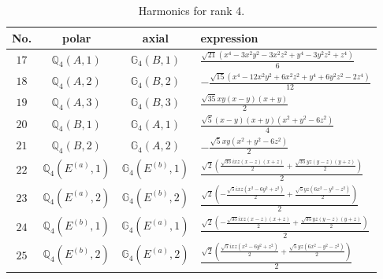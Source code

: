 \documentclass[fleqn,8pt,landscape]{jsarticle}
\begin{document}
\begin{table}[ht!]
\begin{center}
\caption{Harmonics for rank 4.}
\renewcommand{\arraystretch}{1.3}
\begin{tabular}{cccl} \hline \hline
No. & polar & axial & expression \\ \hline
$ 17 $ & $ \mathbb{Q}_{4}(A,1) $ & $ \mathbb{G}_{4}(B,1) $ & $ \frac{\sqrt{21} \left(x^{4} - 3 x^{2} y^{2} - 3 x^{2} z^{2} + y^{4} - 3 y^{2} z^{2} + z^{4}\right)}{6} $ \\
$ 18 $ & $ \mathbb{Q}_{4}(A,2) $ & $ \mathbb{G}_{4}(B,2) $ & $ - \frac{\sqrt{15} \left(x^{4} - 12 x^{2} y^{2} + 6 x^{2} z^{2} + y^{4} + 6 y^{2} z^{2} - 2 z^{4}\right)}{12} $ \\
$ 19 $ & $ \mathbb{Q}_{4}(A,3) $ & $ \mathbb{G}_{4}(B,3) $ & $ \frac{\sqrt{35} x y \left(x - y\right) \left(x + y\right)}{2} $ \\
$ 20 $ & $ \mathbb{Q}_{4}(B,1) $ & $ \mathbb{G}_{4}(A,1) $ & $ \frac{\sqrt{5} \left(x - y\right) \left(x + y\right) \left(x^{2} + y^{2} - 6 z^{2}\right)}{4} $ \\
$ 21 $ & $ \mathbb{Q}_{4}(B,2) $ & $ \mathbb{G}_{4}(A,2) $ & $ - \frac{\sqrt{5} x y \left(x^{2} + y^{2} - 6 z^{2}\right)}{2} $ \\
$ 22 $ & $ \mathbb{Q}_{4}(E^{(a)},1) $ & $ \mathbb{G}_{4}(E^{(b)},1) $ & $ \frac{\sqrt{2} \left(\frac{\sqrt{35} i x z \left(x - z\right) \left(x + z\right)}{2} + \frac{\sqrt{35} y z \left(y - z\right) \left(y + z\right)}{2}\right)}{2} $ \\
$ 23 $ & $ \mathbb{Q}_{4}(E^{(a)},2) $ & $ \mathbb{G}_{4}(E^{(b)},2) $ & $ \frac{\sqrt{2} \left(- \frac{\sqrt{5} i x z \left(x^{2} - 6 y^{2} + z^{2}\right)}{2} + \frac{\sqrt{5} y z \left(6 x^{2} - y^{2} - z^{2}\right)}{2}\right)}{2} $ \\
$ 24 $ & $ \mathbb{Q}_{4}(E^{(b)},1) $ & $ \mathbb{G}_{4}(E^{(a)},1) $ & $ \frac{\sqrt{2} \left(- \frac{\sqrt{35} i x z \left(x - z\right) \left(x + z\right)}{2} + \frac{\sqrt{35} y z \left(y - z\right) \left(y + z\right)}{2}\right)}{2} $ \\
$ 25 $ & $ \mathbb{Q}_{4}(E^{(b)},2) $ & $ \mathbb{G}_{4}(E^{(a)},2) $ & $ \frac{\sqrt{2} \left(\frac{\sqrt{5} i x z \left(x^{2} - 6 y^{2} + z^{2}\right)}{2} + \frac{\sqrt{5} y z \left(6 x^{2} - y^{2} - z^{2}\right)}{2}\right)}{2} $ \\
 \hline \hline
\end{tabular}
\end{center}
\end{table}
\end{document}
